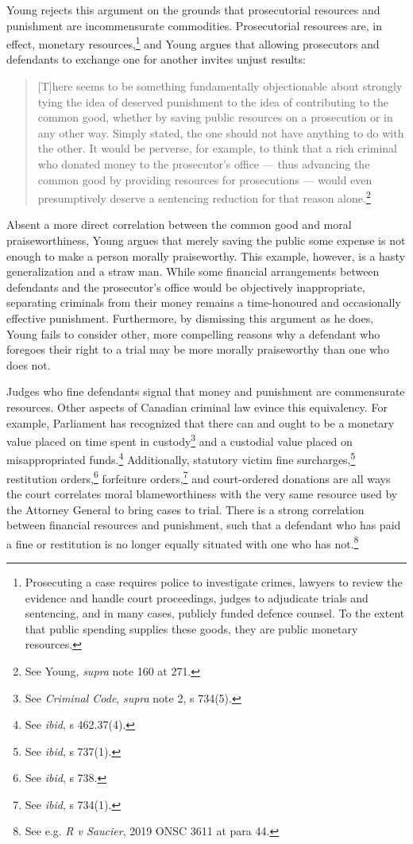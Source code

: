 Young rejects this argument on the grounds that prosecutorial resources and punishment are incommensurate commodities. Prosecutorial resources are, in effect, monetary resources,\footnote{Prosecuting a case requires police to investigate crimes, lawyers to review the evidence and handle court proceedings, judges to adjudicate trials and sentencing, and in many cases, publicly funded defence counsel. To the extent that public spending supplies these goods, they are public monetary resources.} and Young argues that allowing prosecutors and defendants to exchange one for another invites unjust results:

\begin{quote}
    \begin{singlespace}
    
    [T]here seems to be something fundamentally objectionable about strongly tying the idea of deserved punishment to the idea of contributing to the common good, whether by saving public resources on a prosecution or in any other way. Simply stated, the one should not have anything to do with the other. It would be perverse, for example, to think that a rich criminal who donated money to the prosecutor's office — thus advancing the common good by providing resources for prosecutions — would even presumptively deserve a sentencing reduction for that reason alone.\footnote{See Young, \textit{supra} note 160 at 271.}
    \end{singlespace}
\end{quote}
Absent a more direct correlation between the common good and moral praiseworthiness, Young argues that merely saving the public some expense is not enough to make a person morally praiseworthy. This example, however, is a hasty generalization and a straw man. While some financial arrangements between defendants and the prosecutor's office would be objectively inappropriate, separating criminals from their money remains a time-honoured and occasionally effective punishment. Furthermore, by dismissing this argument as he does, Young fails to consider other, more compelling reasons why a defendant who foregoes their right to a trial may be more morally praiseworthy than one who does not.

Judges who fine defendants signal that money and punishment are commensurate resources. Other aspects of Canadian criminal law evince this equivalency. For example, Parliament has recognized that there can and ought to be a monetary value placed on time spent in custody\footnote{See \textit{Criminal Code}, \textit{supra} note 2, s 734(5).} and a custodial value placed on misappropriated funds.\footnote{See \textit{ibid}, s 462.37(4).} Additionally, statutory victim fine surcharges,\footnote{See \textit{ibid}, s 737(1).} restitution orders,\footnote{See \textit{ibid}, s 738.} forfeiture orders,\footnote{See \textit{ibid}, s 734(1).} and court-ordered donations are all ways the court correlates moral blameworthiness with the very same resource used by the Attorney General to bring cases to trial. There is a strong correlation between financial resources and punishment, such that a defendant who has paid a fine or restitution is no longer equally situated with one who has not.\footnote{See e.g. \textit{R v Saucier}, 2019 ONSC 3611 at para 44.}

